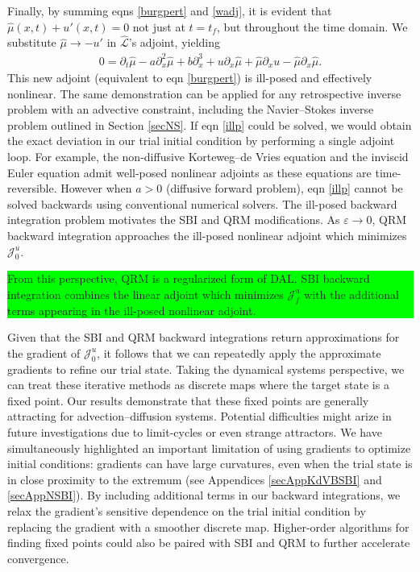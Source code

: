 \documentclass[%
 reprint,
 amsmath,amssymb,
 aps,
 pre,
]{revtex4-2}
\newcommand{\hly}[1]{\colorbox{lime}{\parbox{\columnwidth}{#1}}}
\renewcommand\L {\mathcal{L}}
\newcommand{\Juo}{\mathcal{J}^{u}_0}
\newcommand{\Juf}{\mathcal{J}^{u}_f}
\begin{document}
Finally, by summing eqns \ref{burgpert} and \ref{wadj}, it is evident that $\hat{\mu}(x,t) + u'(x,t) = 0$ not just at $t=t_f$, but throughout the time domain. 
We substitute $\hat{\mu}\to -u'$ in $\hat{\L}$'s adjoint, yielding
\begin{align}
  0 = \partial_t \hat{\mu} - a\partial_x^2 \hat{\mu} + b\partial_x^3 + u\partial_x \hat{\mu} + \hat{\mu}\partial_x u - \hat{\mu}\partial_x \hat{\mu} \label{illp}.
\end{align}
This new adjoint (equivalent to eqn \ref{burgpert}) is ill-posed and effectively nonlinear.
The same demonstration can be applied for any retrospective inverse problem with an advective constraint, including the Navier--Stokes inverse problem outlined in Section \ref{secNS}.
If eqn \ref{illp} could be solved, we would obtain the exact deviation in our trial initial condition by performing a single adjoint loop. 
For example, the non-diffusive Korteweg--de Vries equation and the inviscid Euler equation admit well-posed nonlinear adjoints as these equations are time-reversible.
However when $a>0$ (diffusive forward problem), eqn \ref{illp} cannot be solved backwards using conventional numerical solvers.
The ill-posed backward integration problem motivates the SBI and QRM modifications.
As $\varepsilon\to 0$, QRM backward integration approaches the ill-posed nonlinear adjoint which minimizes $\Juo$.
\hly{From this perspective, QRM is a regularized form of DAL.
SBI backward integration combines the linear adjoint which minimizes $\Juf$ with the additional terms appearing in the ill-posed nonlinear adjoint.}

Given that the SBI and QRM backward integrations return approximations for the gradient of $\Juo$, it follows that we can repeatedly apply the approximate gradients to refine our trial state.
Taking the dynamical systems perspective, we can treat these iterative methods as discrete maps where the target state is a fixed point.
Our results demonstrate that these fixed points are generally attracting for advection--diffusion systems.
Potential difficulties might arize in future investigations due to limit-cycles or even strange attractors.
We have simultaneously highlighted an important limitation of using gradients to optimize initial conditions: gradients can have large curvatures, even when the trial state is in close proximity to the extremum (see Appendices \ref{secAppKdVBSBI} and \ref{secAppNSBI}).
By including additional terms in our backward integrations, we relax the gradient's sensitive dependence on the trial initial condition by replacing the gradient with a smoother discrete map.
Higher-order algorithms for finding fixed points could also be paired with SBI and QRM to further accelerate convergence.
\end{document}

